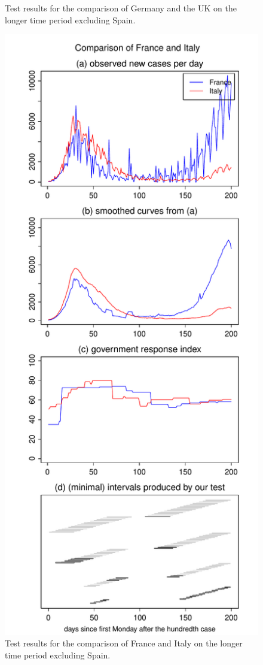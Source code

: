 \documentclass[a4paper,12pt]{article}
\numberwithin{equation}{section}
\begin{document}
\begin{figure}[h!]
\begin{minipage}[t]{0.49\textwidth}
\caption{Test results for the comparison of Germany and the UK on the longer time period excluding Spain.}
\end{minipage}
\hspace{0.25cm}
\begin{minipage}[t]{0.49\textwidth}
\includegraphics[width=\textwidth]{plots/FRA_vs_ITA_four_countries}
\caption{Test results for the comparison of France and Italy on the longer time period excluding Spain.}
\end{minipage}
\end{figure}
\end{document}
